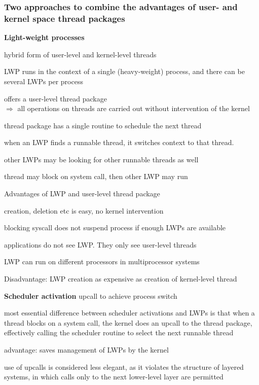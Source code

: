 \subsubsection{Two approaches to combine the advantages of user- and kernel space thread packages}
\begin{compactenum}
	\item \textbf{Light-weight processes}
	\begin{compactitem}
		\item hybrid form of user-level and kernel-level threads
		\item LWP runs in the context of a single (heavy-weight) process, and there can be several LWPs per process
		\item offers a user-level thread package \\ 
		$\Rightarrow$ all operations on threads are carried out without intervention of the kernel
		\item thread package has a single routine to schedule the next thread
		\item when an LWP finds a runnable thread, it switches context to that thread.
		\item other LWPs may be looking for other runnable threads as well
		\item thread may block on system call, then other LWP may run
		\item Advantages of LWP and user-level thread package
		\begin{compactitem}
			\item creation, deletion etc is easy, no kernel intervention
			\item blocking syscall does not suspend process if enough LWPs are available
			\item applications do not see LWP. They only see user-level threads
			\item LWP can run on different processors in multiprocessor systems
		\end{compactitem}
		\item Disadvantage: LWP creation as expensive as creation of kernel-level thread \\
	\end{compactitem}
	\item \textbf{Scheduler activation} upcall to achieve process switch
	\begin{compactitem}
		\item most essential difference between scheduler activations and LWPs is that when a thread blocks on a system call, the kernel does an upcall to the thread package, effectively calling the scheduler routine to select the next runnable thread
		\item advantage: saves management of LWPs by the kernel
		\item use of upcalls is considered less elegant, as it violates the structure of layered systems, in which calls only to the next lower-level layer are permitted
	\end{compactitem}	
\end{compactenum}

